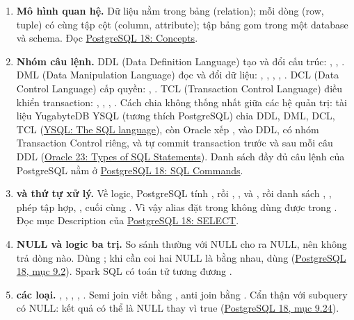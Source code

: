 \begin{enumerate}
  \item \textbf{Mô hình quan hệ.} Dữ liệu nằm trong bảng (relation); mỗi dòng (row, tuple) có cùng tập cột (column, attribute); tập bảng gom trong một database và schema. Đọc \href{https://www.postgresql.org/docs/current/tutorial-concepts.html}{PostgreSQL 18: Concepts}.
  \item \textbf{Nhóm câu lệnh.} DDL (Data Definition Language) tạo và đổi cấu trúc: , , . DML (Data Manipulation Language) đọc và đổi dữ liệu: , , , , . DCL (Data Control Language) cấp quyền: , . TCL (Transaction Control Language) điều khiển transaction: , , , . Cách chia không thống nhất giữa các hệ quản trị: tài liệu YugabyteDB YSQL (tương thích PostgreSQL) chia DDL, DML, DCL, TCL (\href{https://docs.yugabyte.com/preview/api/ysql/the-sql-language/}{YSQL: The SQL language}), còn Oracle xếp ,  vào DDL, có nhóm Transaction Control riêng, và tự commit transaction trước và sau mỗi câu DDL (\href{https://docs.oracle.com/en/database/oracle/oracle-database/23/sqlrf/Types-of-SQL-Statements.html}{Oracle 23: Types of SQL Statements}). Danh sách đầy đủ câu lệnh của PostgreSQL nằm ở \href{https://www.postgresql.org/docs/current/sql-commands.html}{PostgreSQL 18: SQL Commands}.
  \item \textbf{ và thứ tự xử lý.} Về logic, PostgreSQL tính , rồi , ,  và , rồi danh sách , , phép tập hợp, , cuối cùng . Vì vậy alias đặt trong  không dùng được trong . Đọc mục Description của \href{https://www.postgresql.org/docs/current/sql-select.html}{PostgreSQL 18: SELECT}.
  \item \textbf{NULL và logic ba trị.} So sánh thường với NULL cho ra NULL, nên  không trả dòng nào. Dùng ; khi cần coi hai NULL là bằng nhau, dùng  (\href{https://www.postgresql.org/docs/current/functions-comparison.html}{PostgreSQL 18, mục 9.2}). Spark SQL có toán tử tương đương \code{<=>}.
  \item \textbf{ các loại.} , , , , . Semi join viết bằng , anti join bằng . Cẩn thận  với subquery có NULL: kết quả có thể là NULL thay vì true (\href{https://www.postgresql.org/docs/current/functions-subquery.html}{PostgreSQL 18, mục 9.24}).

\end{enumerate}
